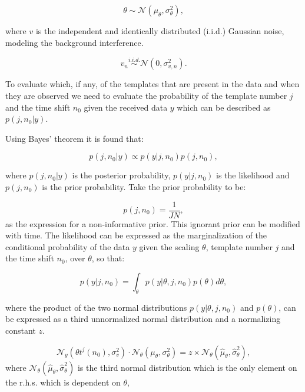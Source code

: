 \begin{equation}\label{eq:MLtheta}
\theta \sim \mathcal{N}(\mu_{\theta},\sigma_{\theta}^2),
\end{equation}

where $v$ is the independent and identically distributed (i.i.d.) Gaussian noise, modeling the background interference.

\begin{equation}\label{eq:MLnoise}
v_n \stackrel{i.i.d.}{\sim} \mathcal{N}(0,\sigma_{v,n}^2).
\end{equation}

To evaluate which, if any, of the templates that are present in the data and when they are observed we need to evaluate the probability of the template number $j$ and the time shift $n_0$ given the received data $y$ which can be described as $p(j,n_0|y)$.

Using Bayes' theorem it is found that:

\begin{equation}\label{eq:MLBayes}
p(j,n_0|y) \propto p(y|j,n_0)p(j,n_0),
\end{equation}

where $p(j,n_0|y)$ is the posterior probability, $p(y|j,n_0)$ is the likelihood and $p(j,n_0)$ is the prior probability.
Take the prior probability to be:

\begin{equation}\label{eq:MLPrior}
p(j,n_0) = \frac{1}{JN},
\end{equation}
as the expression for a non-informative prior. This ignorant prior can be modified with time.
The likelihood can be expressed as the marginalization of the conditional probability of the data $y$ given the scaling $\theta$, template number $j$ and the time shift $n_0$, over $\theta$, so that:

\begin{equation}\label{eq:MLmargin}
p(y|j,n_0)=\int_\theta p(y|\theta, j, n_0) p(\theta) d\theta,
\end{equation}

where the product of the two normal distributions $p(y|\theta, j, n_0)$ and $p(\theta)$, can be expressed as a third unnormalized normal distribution and a normalizing constant $z$.

\begin{equation}\label{eq:MLprod1}
\mathcal{N}_y(\theta t^j(n_0),\sigma_v^2)\cdot\mathcal{N}_\theta(\mu_\theta,\sigma^2_\theta) = z \times \mathcal{N}_\theta(\hat{\mu}_\theta,\hat{\sigma}^2_\theta),
\end{equation}
where $\mathcal{N}_\theta(\hat{\mu}_\theta,\hat{\sigma}_\theta^2)$ is the third normal distribution which is the only element on the r.h.s. which is dependent on $\theta$,

